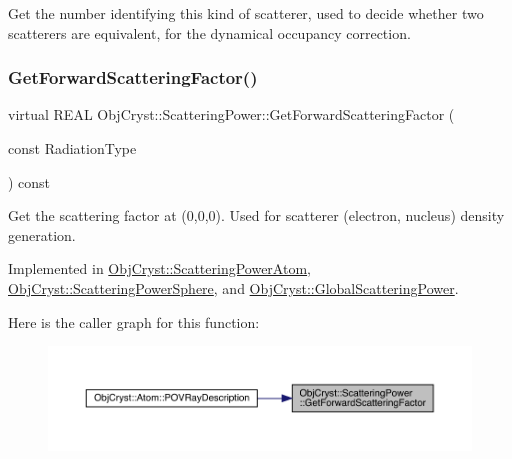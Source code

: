 Get the number identifying this kind of scatterer, used to decide whether two scatterers are equivalent, for the dynamical occupancy correction. \mbox{\label{class_obj_cryst_1_1_scattering_power_a854b51b9b08e96af0fe7986fe372c50c}} 
\subsubsection{\texorpdfstring{GetForwardScatteringFactor()}{GetForwardScatteringFactor()}}
{\footnotesize\ttfamily virtual R\+E\+AL Obj\+Cryst\+::\+Scattering\+Power\+::\+Get\+Forward\+Scattering\+Factor (\begin{DoxyParamCaption}\item[{const}]{Radiation\+Type }\end{DoxyParamCaption}) const\hspace{0.3cm}{\ttfamily [pure virtual]}}

Get the scattering factor at (0,0,0). Used for scatterer (electron, nucleus) density generation. 

Implemented in \mbox{\hyperlink{class_obj_cryst_1_1_scattering_power_atom_abe4d6e3b47759d143b5686abf490744f}{Obj\+Cryst\+::\+Scattering\+Power\+Atom}}, \mbox{\hyperlink{class_obj_cryst_1_1_scattering_power_sphere_acb5f0ee9cefb940656dea42f7542c0ad}{Obj\+Cryst\+::\+Scattering\+Power\+Sphere}}, and \mbox{\hyperlink{class_obj_cryst_1_1_global_scattering_power_a76cf0e6d0bb30b0f7036cb6b65b45410}{Obj\+Cryst\+::\+Global\+Scattering\+Power}}.

Here is the caller graph for this function\+:
\nopagebreak
\begin{figure}[H]
\begin{center}
\leavevmode
\includegraphics[width=350pt]{class_obj_cryst_1_1_scattering_power_a854b51b9b08e96af0fe7986fe372c50c_icgraph}
\end{center}
\end{figure}
\mbox{\label{class_obj_cryst_1_1_scattering_power_a831505bd54282ec723e694f38e934ada}} 
